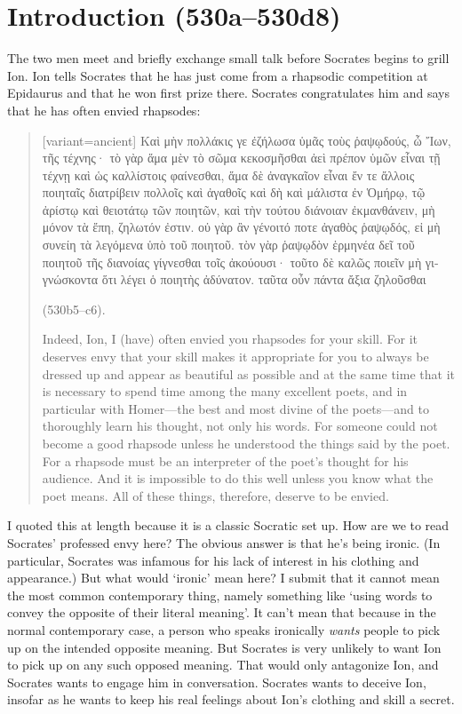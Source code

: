 \documentclass[12pt,letterpaper]{article}
\begin{document}
\section{Introduction (530a--530d8)}

The two men meet and briefly exchange small talk before Socrates begins to grill Ion. Ion tells Socrates that he has just come from a rhapsodic competition at Epidaurus and that he won first prize there. Socrates congratulates him and says that he has often envied rhapsodes: 

\begin{quote}
    \begin{greek}[variant=ancient]
    Καὶ μὴν πολλάκις γε ἐζήλωσα ὑμᾶς τοὺς ῥαψῳδούς, ὦ Ἴων, τῆς τέχνης· τὸ γὰρ ἅμα μὲν τὸ σῶμα κεκοσμῆσθαι ἀεὶ πρέπον ὑμῶν εἶναι τῇ τέχνῃ καὶ ὡς καλλίστοις φαίνεσθαι, ἅμα δὲ ἀναγκαῖον εἶναι ἔν τε ἄλλοις ποιηταῖς διατρίβειν πολλοῖς καὶ ἀγαθοῖς καὶ δὴ καὶ μάλιστα ἐν Ὁμήρῳ, τῷ ἀρίστῳ καὶ θειοτάτῳ τῶν ποιητῶν, καὶ τὴν τούτου διάνοιαν ἐκμανθάνειν, μὴ μόνον τὰ ἔπη, ζηλωτόν ἐστιν. οὐ γὰρ ἂν γένοιτό ποτε ἀγαθὸς ῥαψῳδός, εἰ μὴ συνείη τὰ λεγόμενα ὑπὸ τοῦ ποιητοῦ. τὸν γὰρ ῥαψῳδὸν ἑρμηνέα δεῖ τοῦ ποιητοῦ τῆς διανοίας γίγνεσθαι τοῖς ἀκούουσι· τοῦτο δὲ καλῶς ποιεῖν μὴ γιγνώσκοντα ὅτι λέγει ὁ ποιητὴς ἀδύνατον. ταῦτα οὖν πάντα ἄξια ζηλοῦσθαι
    \end{greek} (530b5--c6).

    Indeed, Ion, I (have) often envied you rhapsodes for your skill. For it deserves envy that your skill makes it appropriate for you to always be dressed up and appear as beautiful as possible and at the same time that it is necessary to spend time among the many excellent poets, and in particular with Homer---the best and most divine of the poets---and to thoroughly learn his thought, not only his words. For someone could not become a good rhapsode unless he understood the things said by the poet. For a rhapsode must be an interpreter of the poet's thought for his audience. And it is impossible to do this well unless you know what the poet means. All of these things, therefore, deserve to be envied.
\end{quote}

I quoted this at length because it is a classic Socratic set up. How are we to read Socrates' professed envy here? The obvious answer is that he's being ironic. (In particular, Socrates was infamous for his lack of interest in his clothing and appearance.) But what would `ironic' mean here? I submit that it cannot mean the most common contemporary thing, namely something like `using words to convey the opposite of their literal meaning'. It can't mean that because in the normal contemporary case, a person who speaks ironically \emph{wants} people to pick up on the intended opposite meaning. But Socrates is very unlikely to want Ion to pick up on any such opposed meaning. That would only antagonize Ion, and Socrates wants to engage him in conversation. Socrates wants to deceive Ion, insofar as he wants to keep his real feelings about Ion's clothing and skill a secret.
\end{document}
